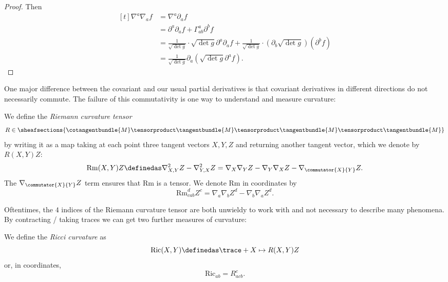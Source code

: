\documentclass[titlepage,numbers=noenddot,headinclude,oneside,%
footinclude=true,cleardoublepage=empty,%
BCOR=5mm,paper=a4,fontsize=11pt,%
english,%
]{scrartcl}
\newcommand{\Ricci}{\mathrm{Ric}} %
\newcommand{\riemanncurvature}{\mathrm{Rm}} %
\begin{document}
\begin{proof}
    Then
    \begin{equation*}
        \begin{aligned}[t]
            \nabla^a \nabla_a f&= \nabla^a \partial_a f\\
            &=\partial^a \partial_a f+\Gamma^a_{ab} \partial^b f\\
            &=\frac{1}{\sqrt{\det{g}}}\cdot \sqrt{\det{g}}\partial^a\partial_a f+\frac{1}{\sqrt{\det{g}}}\cdot (\partial_b \sqrt{\det{g}})(\partial^b f)\\
            &=\frac{1}{\sqrt{\det{g}}}\partial_a(\sqrt{\det{g}}\partial^a f).
        \end{aligned}
    \end{equation*}
\end{proof}


One major difference between the covariant and our usual partial derivatives is that covariant derivatives in different directions do not necessarily commute. The failure of this commutativity is one way to understand and measure curvature:
\begin{definition}
    We define the \emph{Riemann curvature tensor} 
    \begin{equation*}
        R\in \sheafsections{\cotangentbundle{M}\tensorproduct \tangentbundle{M}\tensorproduct \tangentbundle{M}\tensorproduct \tangentbundle{M}}
    \end{equation*} 
    by writing it as a map taking at each point three tangent vectors \( X,Y,Z \) and returning another tangent vector, which we denote by \( R(X,Y)Z \):
    \begin{equation*}
        \riemanncurvature(X,Y)Z\definedas \nabla^2_{X,Y}Z-\nabla^2_{Y,X}Z=\nabla_X \nabla_Y Z- \nabla_Y \nabla_X Z -\nabla_{\commutator{X}{Y}}Z.
    \end{equation*}
    The \( \nabla_{\commutator{X}{Y}}Z \) term ensures that \(  \riemanncurvature \) is a tensor. We denote \(  \riemanncurvature \) in coordinates by
    \begin{equation*}
        \riemanncurvature^d_{cab}Z^c=\nabla_a \nabla_b Z^d-\nabla_b \nabla_a Z^d.
    \end{equation*}
\end{definition}
Oftentimes, the \( 4 \) indices of the Riemann curvature tensor are both unwieldy to work with and not necessary to describe many phenomena. By contracting / taking traces we can get two further measures of curvature:
\begin{definition}
    We define the \emph{Ricci curvature} as
    \begin{equation*}
        \Ricci(X,Y)\definedas\trace+{X\mapsto R(X,Y)Z}
    \end{equation*}
    or, in coordinates,
    \begin{equation*}
        \Ricci_{ab}=R^c_{acb}.
    \end{equation*}
\end{definition}
\end{document}
